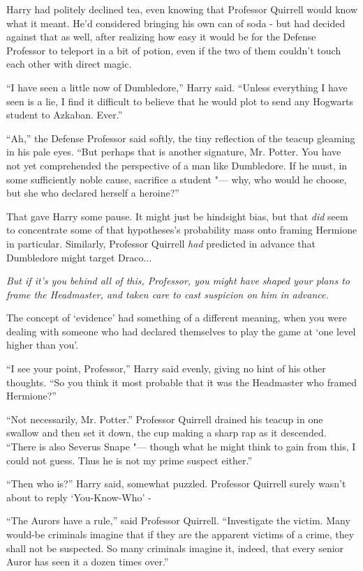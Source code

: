Harry had politely declined tea, even knowing that Professor Quirrell
would know what it meant. He'd considered bringing his own can of soda -
but had decided against that as well, after realizing how easy it would
be for the Defense Professor to teleport in a bit of potion, even if the
two of them couldn't touch each other with direct magic.

``I have seen a little now of Dumbledore,'' Harry said. ``Unless
everything I have seen is a lie, I find it difficult to believe that he
would plot to send any Hogwarts student to Azkaban. Ever.''

``Ah,'' the Defense Professor said softly, the tiny reflection of the
teacup gleaming in his pale eyes. ``But perhaps that is another
signature, Mr. Potter. You have not yet comprehended the perspective of
a man like Dumbledore. If he must, in some sufficiently noble cause,
sacrifice a student "--- why, who would he choose, but she who declared
herself a heroine?''

That gave Harry some pause. It might just be hindsight bias, but that
\emph{did} seem to concentrate some of that hypotheses's probability
mass onto framing Hermione in particular. Similarly, Professor Quirrell
\emph{had} predicted in advance that Dumbledore might target
Draco...

\emph{But if it's you behind all of this, Professor, you might have
shaped your plans to frame the Headmaster, and taken care to cast
suspicion on him in advance.}

The concept of `evidence' had something of a different meaning, when you
were dealing with someone who had declared themselves to play the game
at `one level higher than you'.

``I see your point, Professor,'' Harry said evenly, giving no hint of
his other thoughts. ``So you think it most probable that it was the
Headmaster who framed Hermione?''

``Not necessarily, Mr. Potter.'' Professor Quirrell drained his teacup
in one swallow and then set it down, the cup making a sharp rap as it
descended. ``There is also Severus Snape "--- though what he might think to
gain from this, I could not guess. Thus he is not my prime suspect
either.''

``Then who is?'' Harry said, somewhat puzzled. Professor Quirrell surely
wasn't about to reply `You-Know-Who' -

``The Aurors have a rule,'' said Professor Quirrell. ``Investigate the
victim. Many would-be criminals imagine that if they are the apparent
victims of a crime, they shall not be suspected. So many criminals
imagine it, indeed, that every senior Auror has seen it a dozen times
over.''

